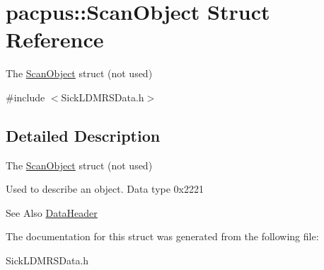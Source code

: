 \hypertarget{structpacpus_1_1ScanObject}{\section{pacpus\-:\-:Scan\-Object Struct Reference}
\label{structpacpus_1_1ScanObject}
}


The \hyperlink{structpacpus_1_1ScanObject}{Scan\-Object} struct (not used)  




{\ttfamily \#include $<$Sick\-L\-D\-M\-R\-S\-Data.\-h$>$}



\subsection{Detailed Description}
The \hyperlink{structpacpus_1_1ScanObject}{Scan\-Object} struct (not used) 

Used to describe an object. Data type 0x2221\begin{DoxySeeAlso}{See Also}
\hyperlink{structpacpus_1_1DataHeader}{Data\-Header} 
\end{DoxySeeAlso}


The documentation for this struct was generated from the following file\-:\begin{DoxyCompactItemize}
\item 
Sick\-L\-D\-M\-R\-S\-Data.\-h\end{DoxyCompactItemize}
